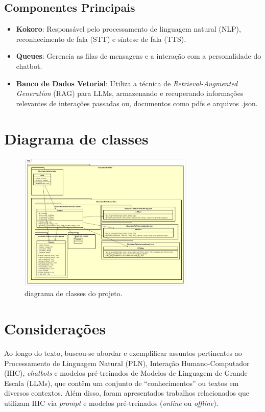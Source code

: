 \documentclass[10pt, conference, compsocconf]{IEEEtran}
\begin{document}
\subsection{Componentes Principais}
\begin{itemize}
    \item \textbf{Kokoro}: Responsável pelo processamento de linguagem natural (NLP), reconhecimento de fala (STT) e síntese de fala (TTS).
    \item \textbf{Queues}: Gerencia as filas de mensagens e a interação com a personalidade do chatbot.
    \item \textbf{Banco de Dados Vetorial}: Utiliza a técnica de \textit{Retrieval-Augmented Generation} (RAG) para LLMs, armazenando e recuperando informações relevantes de interações passadas ou, documentos como pdfs e arquivos .json.
\end{itemize}

\section{Diagrama de classes}

\FloatBarrier

\begin{figure}[!h]
\centering
\includegraphics[width=3.3in]{images/Class Diagram.png}
\caption{diagrama de classes do projeto.} 
\label{fig:estrutura}
\end{figure}

\FloatBarrier

\section{Considerações}

Ao longo do texto, buscou-se abordar e exemplificar assuntos pertinentes ao Processamento de Linguagem Natural (PLN), Interação Humano-Computador (IHC), \textit{chatbots} e modelos pré-treinados de Modelos de Linguagem de Grande Escala (LLMs), que contêm um conjunto de ``conhecimentos'' ou textos em diversos contextos. Além disso, foram apresentados trabalhos relacionados que utilizam IHC via \textit{prompt} e modelos pré-treinados (\textit{online} ou \textit{offline}).
\end{document}
